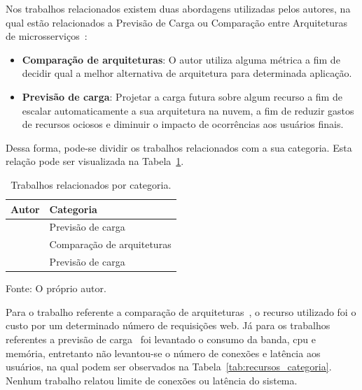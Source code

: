 Nos trabalhos relacionados existem duas abordagens utilizadas pelos autores, na qual estão relacionados a Previsão de Carga ou Comparação entre Arquiteturas de microsserviços~\cite{7515686, 6374456}:

\begin{itemize}
  \item \textbf{Comparação de arquiteturas}: O autor utiliza alguma métrica a fim de decidir qual a melhor alternativa de arquitetura para determinada aplicação.
  \item \textbf{Previsão de carga}: Projetar a carga futura sobre algum recurso a fim de escalar automaticamente a sua arquitetura na nuvem, a fim de reduzir gastos de recursos ociosos e diminuir o impacto de ocorrências aos usuários finais.
\end{itemize}

Dessa forma, pode-se dividir os trabalhos relacionados com a sua categoria.
%
Esta relação pode ser visualizada na Tabela~\ref{tab:categoria_trabalhos}.

\begin{table}[htb!]
\centering
\caption{Trabalhos relacionados por categoria.}
\label{tab:categoria_trabalhos}
\begin{tabular}{l|l}
\hline
Autor & Categoria                            \\ \hline
\cite{6374456}  & Previsão de carga          \\ \hline
\cite{7515686}  & Comparação de arquiteturas \\ \hline
\cite{1417630}  & Previsão de carga          \\ \hline
\end{tabular}


Fonte: O próprio autor.
\end{table}

Para o trabalho referente a comparação de arquiteturas~\cite{7515686}, o recurso utilizado foi o custo por um determinado número de requisições web.
%
Já para os trabalhos referentes a previsão de carga~\cite{6374456, 1417630} foi levantado o consumo da banda, \ac{cpu} e memória, entretanto não levantou-se o número de conexões e latência aos usuários, na qual podem ser observados na Tabela~\ref{tab:recursos_categoria}.
%
Nenhum trabalho relatou limite de conexões ou latência do sistema.

